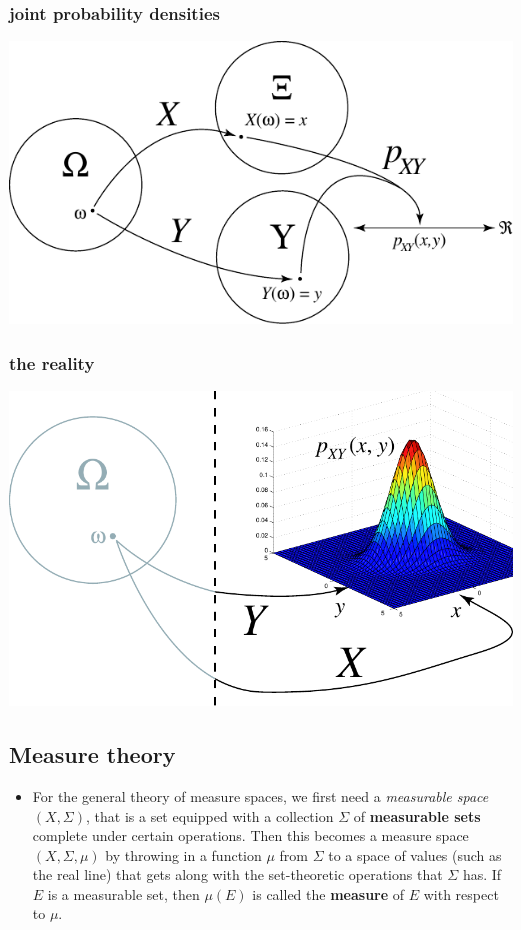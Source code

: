 \begin{frame}
\frametitle{joint probability densities}
\begin{center}	
			\includegraphics[scale=0.45]{fig/probjointdens18.pdf}
	\end{center}		
\end{frame}

\begin{frame}
\frametitle{the reality}
\begin{center}	
			\includegraphics[scale=0.45]{fig/probreality19.pdf}
	\end{center}		
\end{frame}

\subsection{Measure theory}
\begin{frame}
\begin{itemize}
\item For the general theory of measure spaces, we first need a \emph{measurable space} $(X, \Sigma)$, that is a set equipped with a collection $\Sigma$ of \textbf{measurable sets} complete under certain operations. Then this becomes a measure space $(X, \Sigma, \mu)$ by throwing in a function $\mu$ from $\Sigma$ to a space of values (such as the real line) that gets along with the set-theoretic operations that $\Sigma$ has. If $E$ is a measurable set, then $\mu(E)$ is called the \textbf{measure} of $E$ with respect to $\mu$. \cite{Houle2011}
\end{itemize}
\end{frame}

